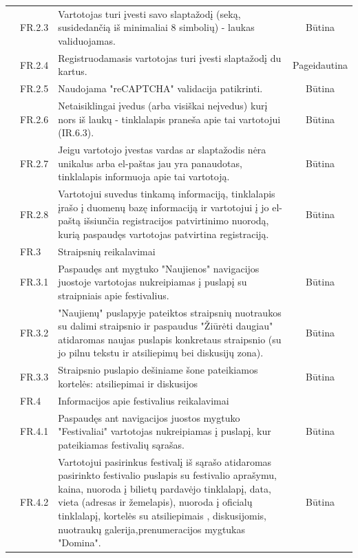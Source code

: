 \documentclass{VUMIFPSkursinis}
\begin{document}
\begin{longtable}{|p{1cm}|p{3cm}|p{9cm}|c|}
 & FR.2.3 & Vartotojas turi įvesti savo slaptažodį (seką, susidedančią iš minimaliai 8 simbolių) - laukas validuojamas. & Būtina \\ \cline{2-4} 
 & FR.2.4 & Registruodamasis vartotojas turi įvesti slaptažodį du kartus. & Pageidautina \\ \cline{2-4} 
 & FR.2.5 & Naudojama "reCAPTCHA" validacija patikrinti. & Būtina \\ \cline{2-4} 
 & FR.2.6 & Netaisiklingai įvedus (arba visiškai neįvedus) kurį nors iš laukų - tinklalapis praneša apie tai vartotojui (IR.6.3). & Būtina \\ \cline{2-4} 
 & FR.2.7 & Jeigu vartotojo įvestas vardas ar slaptažodis nėra unikalus arba el-paštas jau yra panaudotas, tinklalapis informuoja apie tai vartotoją. & Būtina \\ \cline{2-4} 
 & FR.2.8 & Vartotojui suvedus tinkamą informaciją, tinklalapis įrašo į duomenų bazę informaciją ir vartotojui į jo el-paštą išsiunčia registracijos patvirtinimo nuorodą, kurią paspaudęs vartotojas patvirtina registraciją. & Būtina \\ \cline{2-4} 
 &  \cellcolor{light-gray}FR.3 & \multicolumn{2}{l|}{ \cellcolor{light-gray}Straipsnių reikalavimai} \\ \cline{2-4} 
 & FR.3.1 & Paspaudęs ant mygtuko "Naujienos" navigacijos juostoje vartotojas nukreipiamas į puslapį su straipniais apie festivalius. & Būtina \\ \cline{2-4} 
 & FR.3.2 & "Naujienų" puslapyje pateiktos straipsnių nuotraukos su dalimi straipsnio ir paspaudus "Žiūrėti daugiau" atidaromas naujas puslapis konkretaus straipsnio (su jo pilnu tekstu ir atsiliepimų bei diskusijų zona). & Būtina \\ \cline{2-4} 
 & FR.3.3 & Straipsnio puslapio dešiniame šone pateikiamos kortelės: atsiliepimai ir diskusijos & Būtina \\ \cline{2-4} 
 &  \cellcolor{light-gray}FR.4 & \multicolumn{2}{l|}{ \cellcolor{light-gray}Informacijos apie festivalius reikalavimai} \\ \cline{2-4} 
 & FR.4.1 & Paspaudęs ant navigacijos juostos mygtuko "Festivaliai" vartotojas nukreipiamas į puslapį, kur pateikiamas festivalių sąrašas. & Būtina \\ \cline{2-4} 
 & FR.4.2 & Vartotojui pasirinkus festivalį iš sąrašo atidaromas pasirinkto festivalio puslapis su festivalio aprašymu, kaina, nuoroda į bilietų pardavėjo tinklalapį, data, vieta (adresas ir žemelapis), nuoroda į oficialų tinklalapį, kortelės su atsiliepimais , diskusijomis, nuotraukų galerija,prenumeracijos mygtukas "Domina". & Būtina \\ \cline{2-4} 

\end{longtable}
\end{document}
